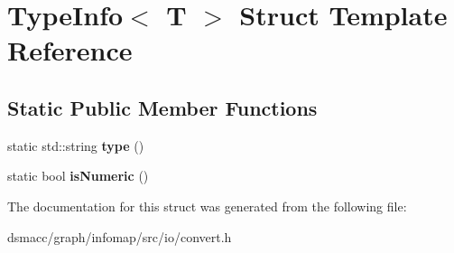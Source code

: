 \hypertarget{structTypeInfo}{}\section{Type\+Info$<$ T $>$ Struct Template Reference}
\label{structTypeInfo}
\subsection*{Static Public Member Functions}
\begin{DoxyCompactItemize}
\item 
\mbox{\label{structTypeInfo_acf42a7635d4ce3d9e92e5e925589c2dd}} 
static std\+::string {\bfseries type} ()
\item 
\mbox{\label{structTypeInfo_a8090628f937181ee87433b4c24e09db8}} 
static bool {\bfseries is\+Numeric} ()
\end{DoxyCompactItemize}


The documentation for this struct was generated from the following file\+:\begin{DoxyCompactItemize}
\item 
dsmacc/graph/infomap/src/io/convert.\+h\end{DoxyCompactItemize}
